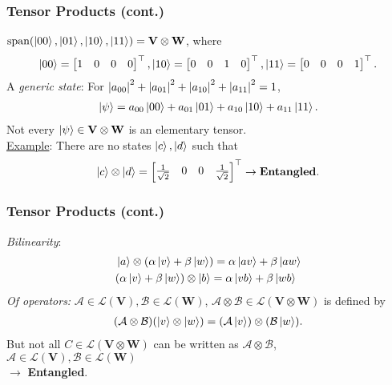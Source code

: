 \documentclass{beamer}
\theoremstyle{definition}
\newcommand{\V}{\mathbf{V}}
\newcommand{\W}{\mathbf{W}}
\newcommand{\A}{\mathcal{A}}
\newcommand{\B}{\mathcal{B}}
\newcommand{\xpan}{\text{span}}
\newcommand{\lag}{\mathcal{L}}
\begin{document}
\begin{frame}
\frametitle{Tensor Products (cont.)}

$\xpan(\ket{00}, \ket{01}, \ket{10}, \ket{11}) = \V\otimes \W$, where
\begin{align*}
\left\vert{00}\right\rangle = \begin{bmatrix}
1&0&0&0
\end{bmatrix}^\top, \left\vert{10}\right\rangle = \begin{bmatrix}
0&0&1&0
\end{bmatrix}^\top, \left\vert{11}\right\rangle = \begin{bmatrix}
0&0&0&1
\end{bmatrix}^\top.
\end{align*}
A \textit{generic state}: For $\abs{a_{00}}^2 + \abs{a_{01}}^2 + \abs{a_{10}}^2 + \abs{a_{11}}^2 = 1$,
\begin{align*}
\left\vert{\psi}\right\rangle = a_{00}\left\vert{00}\right\rangle + a_{01}\left\vert{01}\right\rangle + a_{10}\left\vert{10}\right\rangle + a_{11}\left\vert{11}\right\rangle.
\end{align*}
Not every $\ket{\psi} \in \V\otimes \W$ is an elementary tensor. \\
$\,$\\
\underline{Example}: There are no states $\left\vert{c}\right\rangle, \left\vert{d}\right\rangle$ such that
\begin{align*}
\left\vert{c}\right\rangle \otimes \left\vert{d}\right\rangle = \begin{bmatrix}
\frac{1}{\sqrt{2}} & 0 & 0 & \frac{1}{\sqrt{2}}
\end{bmatrix}^\top \rightarrow \textbf{Entangled}.
\end{align*}

\end{frame}

\begin{frame}
\frametitle{Tensor Products (cont.)}
\textit{Bilinearity}:
\begin{align*}
&\left\vert{a}\right\rangle \otimes (\alpha\left\vert{v}\right\rangle + \beta\left\vert{w}\right\rangle) = \alpha\left\vert{av}\right\rangle + \beta\left\vert{aw}\right\rangle\\
&(\alpha\left\vert{v}\right\rangle + \beta\left\vert{w}\right\rangle) \otimes \left\vert{b}\right\rangle = \alpha\left\vert{vb}\right\rangle + \beta\left\vert{wb}\right\rangle
\end{align*}
\textit{Of operators:} $\A \in \mathfrak{\lag}(\V), \mathcal{B} \in \mathfrak{\lag}(\W)$, $\A\otimes \B \in \mathfrak{\lag}(\V \otimes \W)$ is defined by
\begin{align*}
(\A \otimes \B)(\ket{v}\otimes \ket{w}) = (\A\ket{v})\otimes (\B\ket{w}).
\end{align*}
But not all $C \in \mathfrak{\lag}(\V\otimes \W)$ can be written as $\A \otimes \B$, $\A \in \mathfrak{\lag}(\V), \mathcal{B} \in \mathfrak{\lag}(\W)$\\ $\rightarrow$ \textbf{Entangled}.
\end{frame}
\end{document}
